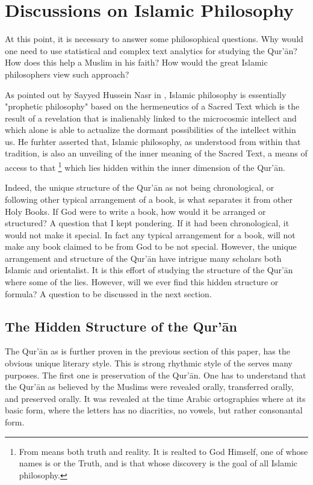 \section{Discussions on Islamic Philosophy}\label{sec:result_islamic_philosophy}
At this point, it is necessary to answer some philosophical questions. Why would one need to use statistical and complex text analytics for studying the Qur'\=an? How does this help a Muslim in his faith? How would the great Islamic philosophers view such approach?

As pointed out by Sayyed Hussein Nasr in \cite{nasr2013history}, Islamic philosophy is essentially "prophetic philosophy" based on the hermeneutics of a Sacred Text which is the result of a revelation that is inalienably linked to the microcosmic intellect and which alone is able to actualize the dormant possibilities of the intellect within us. He furhter asserted that, Islamic philosophy, as understood from within that tradition, is also an unveiling of the inner meaning of the Sacred Text, a means of access to that  \footnote{From \cite{nasr2013history}   means both truth and reality. It is realted to God Himself, one of whose names is   or the Truth, and is that whose discovery is the goal of all Islamic philosophy.} which lies hidden within the inner dimension of the Qur'\=an.

Indeed, the unique structure of the Qur'\=an as not being chronological, or following other typical arrangement of a book, is what separates it from other Holy Books. If God were to write a book, how would it be arranged or structured? A question that I kept pondering. If it had been chronological, it would not make it special. In fact any typical arrangement for a book, will not make any book claimed to be from God to be not special. However, the unique arrangement and structure of the Qur'\=an have intrigue many scholars both Islamic and orientalist. It is this effort of studying the structure of the Qur'\=an where some of the   lies. However, will we ever find this hidden structure or formula? A question to be discussed in the next section.

\subsection{The Hidden Structure of the Qur'\=an}
The Qur'\=an as is further proven in the previous section of this paper, has the obvious unique literary style. This is strong rhythmic style of the   serves many purposes. The first one is preservation of the Qur'\=an. One has to understand that the Qur'\=an as believed by the Muslims were revealed orally, transferred orally, and preserved orally. It was revealed at the time Arabic ortographies where at its basic form, where the letters has no diacritics, no vowels, but rather consonantal form. 

